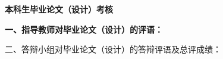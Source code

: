 \cleardoublepage{}
\begin{center}
    \bfseries {} 本科生毕业论文（设计）考核
\end{center}

{
    \bfseries
    \noindent 一、指导教师对毕业论文（设计）的评语：\\
    \vskip 50mm

    \signature{指导教师（签名）}

    \noindent 二、答辩小组对毕业论文（设计）的答辩评语及总评成绩：\\

    \mbox{} \vfill

    \finaleval[][][][][]

    \signature{负责人（签名）}
}

